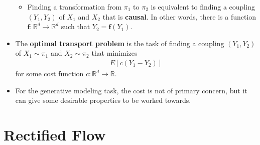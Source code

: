 \documentclass[10pt]{article}
\newcommand{\ve}[1]{\mathbf{#1}}
\newcommand{\Real}{\mathbb{R}}
\begin{document}
\begin{itemize}
\begin{itemize}
    \item Finding a transformation from $\pi_1$ to $\pi_2$ is equivalent to finding a coupling $(Y_1, Y_2)$ of $X_1$ and $X_2$ that is {\bf causal}. In other words, there is a function $\ve{f}: \Real^d \rightarrow \Real^d$ such that $Y_2 = \ve{f}(Y_1)$.
  \end{itemize}

  \item The {\bf optimal transport problem} is the task of finding a coupling $(Y_1, Y_2)$ of $X_1 \sim \pi_1$ and $X_2 \sim \pi_2$ that minimizes
  \begin{align*}
    E[c(Y_1 - Y_2)]
  \end{align*}
  for some cost function $c: \Real^d \rightarrow \Real$.

  \item For the generative modeling task, the cost is not of primary concern, but it can give some desirable properties to be worked towards.
\end{itemize}

\section{Rectified Flow}
\end{document}
